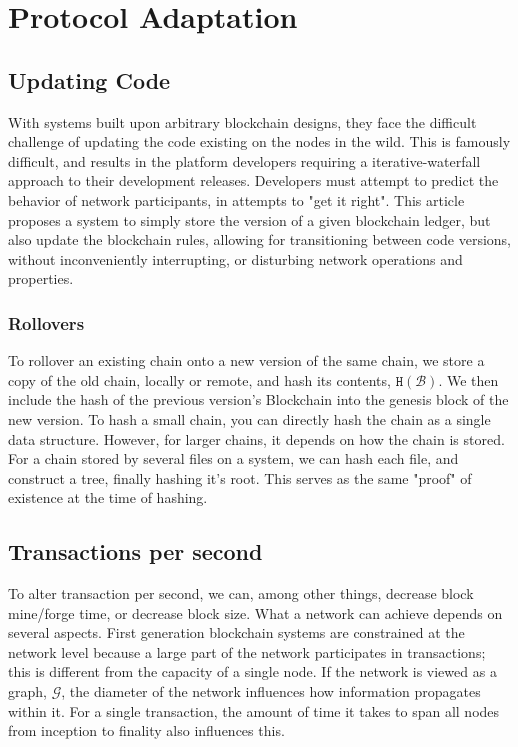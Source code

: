 \documentclass[12pt, titlepage, twocolumn]{report}
\begin{document}
\chapter{Protocol Adaptation}

\section{Updating Code}
With systems built upon arbitrary blockchain designs, they face the difficult challenge of updating the code existing on the nodes in the wild. This is famously difficult, and results in the platform developers requiring a iterative-waterfall approach to their development releases. Developers must attempt to predict the behavior of network participants, in attempts to "get it right". This article proposes a system to simply store the version of a given blockchain ledger, but also update the blockchain rules, allowing for transitioning between code versions, without inconveniently interrupting, or disturbing network operations and properties.  


\subsection{Rollovers}
To rollover an existing chain onto a new version of the same chain, we store a copy of the old chain, locally or remote, and hash its contents, \(\texttt{H}(\boldsymbol{\mathcal{B}})\). We then include the hash of the previous version's Blockchain into the genesis block of the new version. To hash a small chain, you can directly hash the chain as a single data structure. However, for larger chains, it depends on how the chain is stored. For a chain stored by several files on a system, we can hash each file, and construct a tree, finally hashing it's root. This serves as the same "proof" of existence at the time of hashing.


\section{Transactions per second}
To alter transaction per second, we can, among other things, decrease block mine/forge time, or decrease block size. What a network can achieve depends on several aspects. First generation blockchain systems are constrained at the network level because a large part of the network participates in transactions; this is different from the capacity of a single node. If the network is viewed as a graph, \(\mathcal{G}\), the diameter of the network influences how information propagates within it. For a single transaction, the amount of time it takes to span all nodes from inception to finality also influences this.
\end{document}
